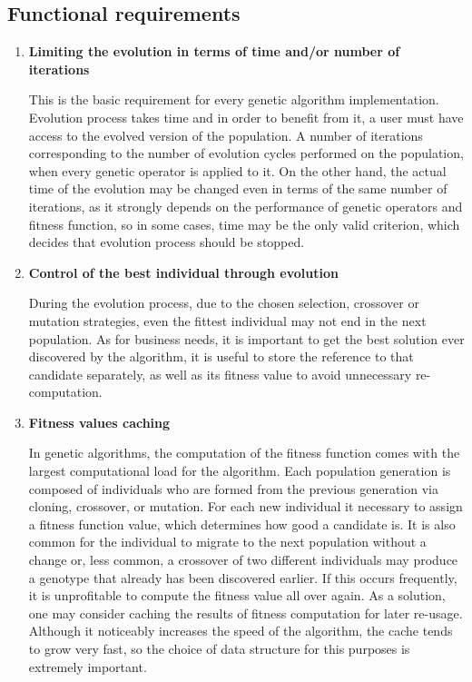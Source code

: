 \subsection{Functional requirements}
\begin{enumerate}
\item \label{freq:stop} \textbf{Limiting the evolution in terms of time and/or number of iterations}

This is the basic requirement for every genetic algorithm implementation. Evolution process takes time and in order to benefit from it, a user must have access to the evolved version of the population. A number of iterations corresponding to the number of evolution cycles performed on the population, when every genetic operator is applied to it. On the other hand, the actual time of the evolution may be changed even in terms of the same number of iterations, as it strongly depends on the performance of genetic operators and fitness function, so in some cases, time may be the only valid criterion, which decides that evolution process should be stopped. 
\medbreak

\item \label{freq:best} \textbf{Control of the best individual through evolution}

During the evolution process, due to the chosen selection, crossover or mutation strategies, even the fittest individual may not end in the next population. As for business needs, it is important to get the best solution ever discovered by the algorithm, it is useful to store the reference to that candidate separately, as well as its fitness value to avoid unnecessary re-computation.
\medbreak

\item \label{freq:cache} \textbf{Fitness values caching}

In genetic algorithms, the computation of the fitness function comes with the largest computational load for the algorithm. Each population generation is composed of individuals who are formed from the previous generation via cloning, crossover, or mutation. For each new individual it necessary to assign a fitness function value, which determines how good a candidate is. It is also common for the individual to migrate to the next population without a change or, less common, a crossover of two different individuals may produce a genotype that already has been discovered earlier. If this occurs frequently, it is unprofitable to compute the fitness value all over again. As a solution, one may consider caching the results of fitness computation for later re-usage. Although it noticeably increases the speed of the algorithm, the cache tends to grow very fast, so the choice of data structure for this purposes is extremely important. 
\medbreak


\end{enumerate}
